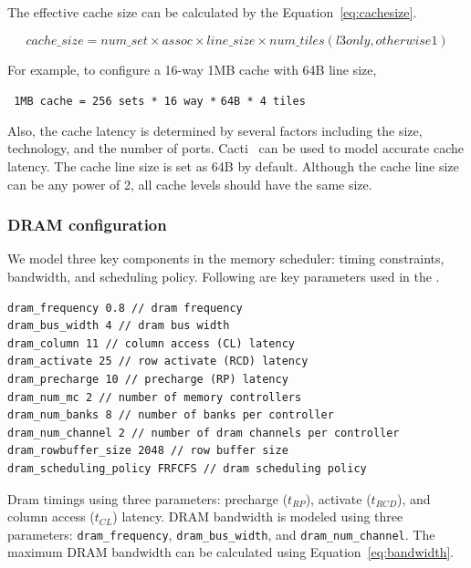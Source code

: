The effective cache size can be calculated by the
Equation~\ref{eq:cachesize}.

\begin{equation}
\label{eq:cachesize}
cache\_size = num\_set \times assoc \times line\_size \times num\_tiles (l3 only, otherwise 1)
\end{equation}


\noindent
For example, to configure a 16-way 1MB cache with 64B line size,

\Verb+ 1MB cache = 256 sets * 16 way *+ \Verb+64B * 4 tiles+

\noindent
Also, the cache latency is determined by several factors including the
size, technology, and the number of ports. Cacti~\cite{cacti} can be
used to model accurate cache latency. The cache line size is set as
64B by default. Although the cache line size can be any power of 2,
all cache levels should have the same size.


\subsubsection{DRAM configuration}
\label{sec:param-dram}

We model three key components in the memory scheduler: timing
constraints, bandwidth, and scheduling policy. Following are key
parameters used in the \SIM.


\begin{Verbatim}
dram_frequency 0.8 // dram frequency
dram_bus_width 4 // dram bus width
dram_column 11 // column access (CL) latency
dram_activate 25 // row activate (RCD) latency
dram_precharge 10 // precharge (RP) latency
dram_num_mc 2 // number of memory controllers
dram_num_banks 8 // number of banks per controller
dram_num_channel 2 // number of dram channels per controller
dram_rowbuffer_size 2048 // row buffer size
dram_scheduling_policy FRFCFS // dram scheduling policy
\end{Verbatim}


Dram timings using three parameters: precharge ($t_{RP}$), activate
($t_{RCD}$), and column access ($t_{CL}$) latency. DRAM bandwidth is
modeled using three
parameters: \Verb+dram_frequency+, \Verb+dram_bus_width+,
and \Verb+dram_num_channel+. The maximum DRAM bandwidth can be
calculated using Equation~\ref{eq:bandwidth}.

